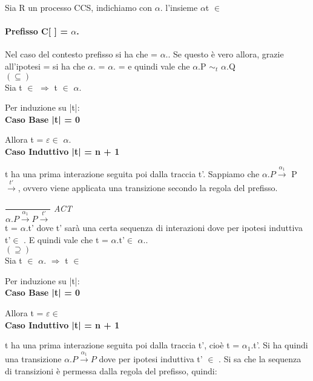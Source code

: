 Sia R un processo CCS, indichiamo con $\alpha$. l'insieme {$\alpha$t $\in$ }

\paragraph{Prefisso C[ ] = $\alpha$.} \mbox{}

Nel caso del contesto prefisso si ha che  = $\alpha$..
Se questo è vero allora, grazie all'ipotesi  =  si ha che  $\alpha$. =  $\alpha$. =  e quindi vale che $\alpha$.P $\sim_{t}$ $\alpha$.Q\\

$(\subseteq)$ \\

Sia  t $\in$  $\Rightarrow$  t $\in$ $\alpha$.

Per induzione su |t|:
\\

\textbf{Caso Base |t| = 0}

Allora t = $\varepsilon \in$ $ \alpha$.
\\

\textbf{Caso Induttivo |t| = n + 1}

t ha una prima interazione seguita poi dalla traccia t'. Sappiamo che $\alpha.P\overset{\alpha_{1}}\rightarrow $ P $\overset{t'}\rightarrow$, ovvero viene applicata una transizione secondo la regola del prefisso.

	$\dfrac{}{\alpha.P \overset{\alpha_{1}}\rightarrow P\overset{t'}\rightarrow}$ \textit{ACT} \\
	
t = $\alpha$.t' dove t' sarà una certa sequenza di interazioni dove per ipotesi induttiva t'$\in$ . E quindi vale che t = $\alpha$.t'$\in$ $\alpha$..\\

$(\supseteq)$ \\

Sia  t $\in$ $\alpha$. $\Rightarrow$  t $\in$ 

Per induzione su |t|:
\\

\textbf{Caso Base |t| = 0}

Allora t = $\varepsilon \in $ 
\\
 
\textbf{Caso Induttivo |t| = n + 1}

t ha una prima interazione seguita poi dalla traccia t', cioè t = $\alpha_{1}$.t'.
Si ha quindi una transizione $\alpha.P \overset{\alpha_{1}}\rightarrow P$ dove per ipotesi induttiva t' $\in$ . Si sa che la sequenza di transizioni è permessa dalla regola del prefisso, quindi:

